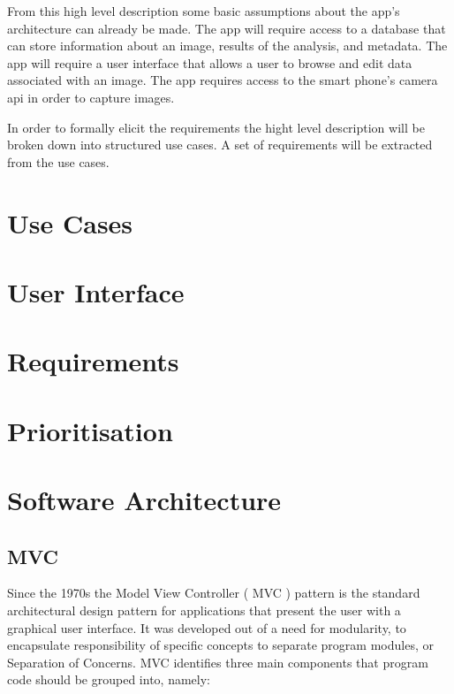 From this high level description some basic assumptions about the app’s architecture can already be made. The app will require access to a database that can store information about an image, results of the analysis, and metadata. The app will require a user interface that allows a user to browse and edit data associated with an image. The app requires access to the smart phone’s camera api in order to capture images.

In order to formally elicit the requirements the hight level description will be broken down into structured use cases. A set of requirements will be extracted from the use cases.

\section{Use Cases}




\section{User Interface}


\section{Requirements}














\section{Prioritisation}


\section{Software Architecture}
\subsection{MVC}
Since the 1970s the Model View Controller ( MVC ) pattern is the standard architectural design pattern for applications that present the user with a graphical user interface. It was developed out of a need for modularity, to encapsulate responsibility of specific concepts to separate program modules, or Separation of Concerns. MVC identifies three main components that program code should be grouped into, namely\cite{walther_2016}:

